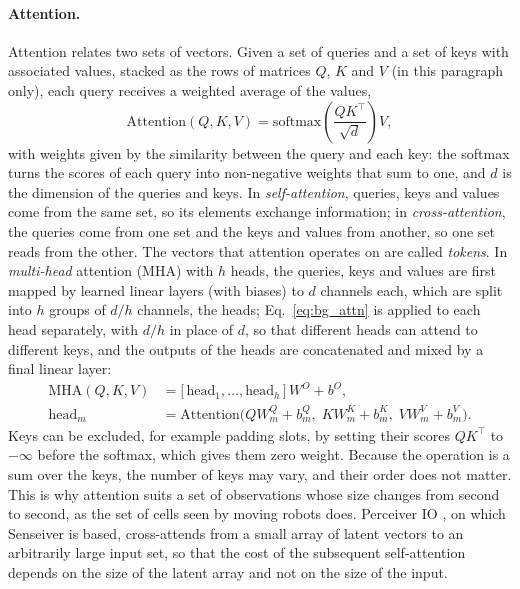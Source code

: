 \documentclass[english, 12pt, a4paper, elec, utf8, a-2b, online]{aaltothesis}
\begin{document}
\paragraph{Attention.}
Attention \cite{vaswani2017attention} relates two sets of vectors. Given a set
of queries and a set of keys with associated values, stacked as the rows of
matrices $Q$, $K$ and $V$ (in this paragraph only), each query receives a
weighted average of the values,
\begin{equation}
	\mathrm{Attention}(Q, K, V) = \mathrm{softmax}\!\left( \frac{Q K^{\top}}{\sqrt{d}} \right) V,
	\label{eq:bg_attn}
\end{equation}
with weights given by the similarity between the query and each key: the
softmax turns the scores of each query into non-negative weights that sum to one,
and $d$ is the dimension of the queries and keys. In \emph{self-attention}, queries,
keys and values come from the same set, so its elements exchange information;
in \emph{cross-attention}, the queries come from one set and the keys and values
from another, so one set reads from the other. The vectors that attention
operates on are called \emph{tokens}. In \emph{multi-head} attention (MHA) with $h$
heads, the queries, keys and values are first mapped by learned linear layers
(with biases) to $d$ channels each, which are split into $h$ groups of $d/h$
channels, the heads; Eq.~\eqref{eq:bg_attn} is applied to each head
separately, with $d/h$ in place of $d$, so that different heads can attend to
different keys, and the outputs of the heads are concatenated and mixed by a
final linear layer:
\begin{equation}
	\begin{aligned}
	\mathrm{MHA}(Q, K, V) &= \big[\, \mathrm{head}_1, \dots, \mathrm{head}_h \,\big]\, W^{O} + b^{O}, \\
	\mathrm{head}_m &= \mathrm{Attention}\big( Q W^{Q}_m + b^{Q}_m,\; K W^{K}_m + b^{K}_m,\; V W^{V}_m + b^{V}_m \big).
	\end{aligned}
	\label{eq:bg_mha}
\end{equation}
Keys can be excluded, for example padding slots, by setting their scores
$Q K^{\top}$ to $-\infty$ before the softmax, which gives them zero weight.
Because the operation is a sum
over the keys, the number of keys may vary, and their order does not matter.
This is why attention suits a set of observations whose size changes from
second to second, as the set of cells seen by moving robots does. Perceiver IO
\cite{jaegle2021perceiver}, on which Senseiver is based, cross-attends from a
small array of latent vectors to an arbitrarily large input set, so that the
cost of the subsequent self-attention depends on the size of the latent array
and not on the size of the input.
\end{document}
